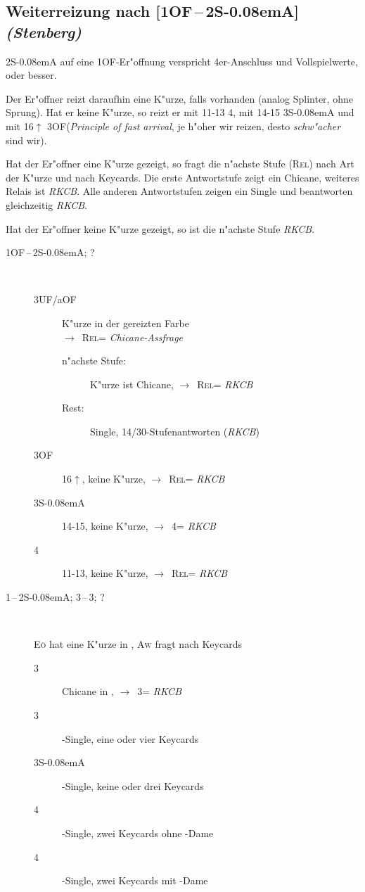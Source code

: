 \documentclass[11pt,german,twocolumn,twoside]{scrartcl}
\def\co{\He\xspace}
\def\tr{\Cl\xspace}
\def\sa{\nobreak\textsf{S\kern-0.08emA}\xspace}
\def\pik{\nobreak\hspace{\cardskip}\Sp\xspace}
\def\coe{\nobreak\hspace{\cardskip}\He\xspace}
\def\kar{\nobreak\hspace{\cardskip}\Di\xspace}
\def\tre{\nobreak\hspace{\cardskip}\Cl\xspace}
\def\SA{\nobreak\hspace{\cardskip}\sa}
\def\of{\nobreak\hspace{\cardskip}\textsf{OF}\xspace}
\def\aof{\nobreak\hspace{\cardskip}\textsf{aOF}\xspace}
\def\uf{\nobreak\hspace{\cardskip}\textsf{UF}\xspace}
\def\ra{$\rightarrow$\xspace}
\def\pl{$\uparrow$\xspace}
\def\sep{\,--\,}
\newcommand{\conv}[1]{\emph{#1}}
\def\rel{\textsc{Rel}\xspace}
\def\aw{\textsc{Aw}\xspace}
\def\eo{\textsc{E\"o}\xspace}
\def\bdsc{\begin{description}}
\def\edsc{\end{description}}
\begin{document}
\subsection{Weiterreizung nach [1\of{}\sep2\SA{}] \conv{(Stenberg)}\label{stenberg}}

2\SA auf eine 1\of-Er"offnung verspricht 4er-Anschluss und
Vollspielwerte, oder besser.

Der Er"offner reizt daraufhin eine K"urze, falls vorhanden
(analog Splinter, ohne Sprung). Hat er
keine K"urze, so reizt er mit 11-13 4\tre, mit 14-15 3\SA und mit
16\pl 3\of (\conv{Principle of fast arrival}, je h"oher wir reizen,
desto \emph{schw"acher} sind wir).

Hat der Er"offner eine K"urze gezeigt, so fragt die n"achste Stufe (\rel) nach
Art der K"urze und nach Keycards.  Die erste Antwortstufe zeigt ein
Chicane, weiteres Relais ist \conv{RKCB}.  Alle anderen Antwortstufen
zeigen ein Single und beantworten gleichzeitig \conv{RKCB}.

Hat der Er"offner keine K"urze gezeigt, so ist die n"achste Stufe \conv{RKCB}.

\bdsc
\item[1\of{}\sep2\SA; ?]~
  \bdsc
  \item[3\uf/\aof] K"urze in der gereizten Farbe \\
    \ra~\rel = \conv{Chicane-Assfrage}
    \bdsc
    \item[n"achste Stufe:] K"urze ist Chicane, \ra~\rel = \conv{RKCB}
    \item[Rest:] Single, 14/30-Stufenantworten (\conv{RKCB})
    \edsc
  \item[3\of] 16\pl, keine K"urze, \ra~\rel = \conv{RKCB}
  \item[3\SA] 14-15, keine K"urze, \ra~4\tre = \conv{RKCB}
  \item[4\tre] 11-13, keine K"urze, \ra~\rel = \conv{RKCB}
  \edsc
\item[1\coe{}\sep2\SA; 3\tre{}\sep3\kar; ?]~

  \eo hat eine K"urze in \tr, \aw fragt nach Keycards
  \bdsc
  \item[3\coe] Chicane in \tre, \ra~3\pik = \conv{RKCB}
  \item[3\pik] \tre-Single, eine oder vier Keycards
  \item[3\SA] \tre-Single, keine oder drei Keycards
  \item[4\tre] \tre-Single, zwei Keycards ohne \co-Dame
  \item[4\kar] \tre-Single, zwei Keycards mit \co-Dame
  \edsc
\edsc
\end{document}
